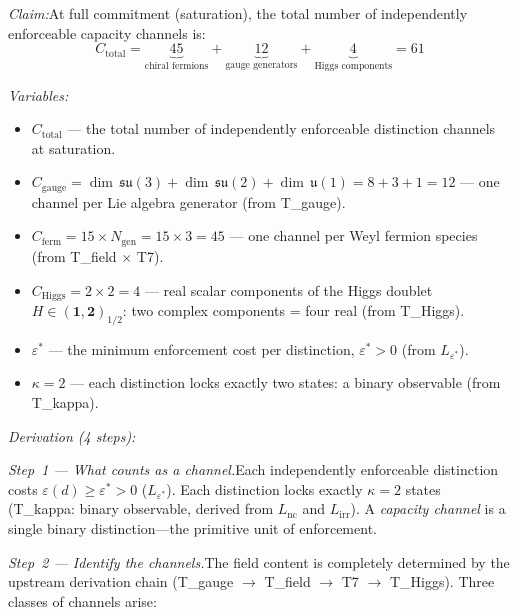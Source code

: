 \documentclass[11pt]{article}
\newcommand{\Ctot}{C_{\mathrm{total}}}
\newcommand{\eps}{\varepsilon}
\newcommand{\Lnc}{L_{\mathrm{nc}}}
\newcommand{\Lirr}{L_{\mathrm{irr}}}
\newcommand{\Leps}{L_{\eps^*}}
\begin{document}
\begin{tcolorbox}[apfbox, title={L\_count: Total Capacity Count}]
\textit{Claim:}\quad At full commitment (saturation), the total number of independently enforceable capacity channels is:
\begin{equation}
\Ctot = \underbrace{45}_{\text{chiral fermions}} + \underbrace{12}_{\text{gauge generators}} + \underbrace{4}_{\text{Higgs components}} = 61
\label{eq:Ctotal}
\end{equation}

\smallskip\noindent\textit{Variables:}
\begin{itemize}[nosep,leftmargin=2em]
\item $\Ctot$ --- the total number of independently enforceable distinction channels at saturation.
\item $C_{\mathrm{gauge}} = \dim\,\mathfrak{su}(3) + \dim\,\mathfrak{su}(2) + \dim\,\mathfrak{u}(1) = 8 + 3 + 1 = 12$ --- one channel per Lie algebra generator (from T\_gauge).
\item $C_{\mathrm{ferm}} = 15 \times N_{\mathrm{gen}} = 15 \times 3 = 45$ --- one channel per Weyl fermion species (from T\_field $\times$ T7).
\item $C_{\mathrm{Higgs}} = 2 \times 2 = 4$ --- real scalar components of the Higgs doublet $H \in (\mathbf{1},\mathbf{2})_{1/2}$: two complex components = four real (from T\_Higgs).
\item $\eps^*$ --- the minimum enforcement cost per distinction, $\eps^* > 0$ (from $\Leps$).
\item $\kappa = 2$ --- each distinction locks exactly two states: a binary observable (from T\_kappa).
\end{itemize}
\end{tcolorbox}

\textit{Derivation (4 steps):}

\textit{Step~1 --- What counts as a channel.}\quad Each independently enforceable distinction costs $\varepsilon(d) \ge \eps^* > 0$ ($\Leps$).  Each distinction locks exactly $\kappa = 2$ states (T\_kappa: binary observable, derived from $\Lnc$ and $\Lirr$).  A \emph{capacity channel} is a single binary distinction---the primitive unit of enforcement.

\textit{Step~2 --- Identify the channels.}\quad The field content is completely determined by the upstream derivation chain (T\_gauge $\to$ T\_field $\to$ T7 $\to$ T\_Higgs).  Three classes of channels arise:
\end{document}
